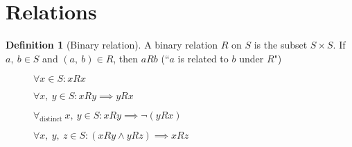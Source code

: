 \documentclass{article}
\theoremstyle{plain}
\numberwithin{theorem}{section}
\theoremstyle{definition}
\newtheorem{definition}{Definition}[section]
\numberwithin{definition}{section}
\theoremstyle{remark}
\numberwithin{note}{section}
\begin{document}
\section{Relations}
\begin{definition}[Binary relation]
	A binary relation $R$ on $S$ is the subset $S\times S$.
	If $a, \: b \in S$ and  $(a, \: b) \in R$,
	then $aRb$ (``$a$ is related to $b$ under $R$")
\end{definition}
%
\begin{figure}[H]
\begin{mdframed}[style=exampledefault,frametitle={Relation properties}]
\begin{description}[style=sameline]
	\item[Reflexive:]
		$\forall x \in S : xRx$
	\item[Symmetric:]
		$\forall x,\: y \in S : xRy \implies yRx$
	\item[Antisymmetric:]
		$\forall_\text{distinct} \: x,\: y \in S : xRy \implies \neg (yRx)$
	\item[Transitive:]
		$\forall x,\: y, \: z \in S : (xRy \land yRz) \implies xRz$
\end{description}
\end{mdframed}
\end{figure}
%
\end{document}
